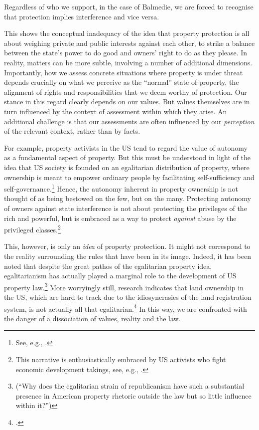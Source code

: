 Regardless of who we support, in the case of Balmedie, we are forced to recognise that protection implies interference and vice versa.

This shows the conceptual inadequacy of the idea that property protection is all about weighing private and public interests against each other, to strike a balance between the state's power to do good and owners' right to do as they please. In reality, matters can be more subtle, involving a number of additional dimensions. Importantly, how we assess concrete situations where property is under threat depends crucially on what we perceive as the ``normal'' state of property, the alignment of rights and responsibilities that we deem  worthy of protection. Our stance in this regard clearly depends on our values. But values themselves are in turn influenced by the context of assessment within which they arise. An additional challenge is that our assessments are often influenced by our \emph{perception} of the relevant context, rather than by facts.

For example, property activists in the US tend to regard the value of autonomy as a fundamental aspect of property. But this must be understood in light of the idea that US society is founded on an egalitarian distribution of property, where ownership is meant to empower ordinary people by facilitating self-sufficiency and self-governance.\footnote{See, e.g., \cite[173]{ely07}.} Hence, the autonomy inherent in property ownership is not thought of as being bestowed on the few, but on the many. Protecting autonomy of owners against state interference is not about protecting the privileges of the rich and powerful, but is embraced as a way to protect {\it against} abuse by the privileged classes.\footnote{This narrative is enthusiastically embraced by US activists who fight economic development takings, see, e.g., \cite{castle15}.} 

This, however, is only an {\it idea} of property protection. It might not correspond to the reality surrounding the rules that have been  in its image. Indeed, it has been noted that despite the great pathos of the egalitarian property idea, egalitarianism has actually played a marginal role to the development of US property law.\footnote{\cite[361]{williams98} (``Why does the egalitarian strain of republicanism have such a substantial presence in American property rhetoric outside the law but so little influence within it?'')} More worryingly still, research indicates that land ownership in the US, which are hard to track due to the idiosyncrasies of the land registration system, is not actually all that egalitarian.\footcite[246-247]{jacobs98} In this way, we are confronted with the danger of a dissociation of values, reality and the law.


